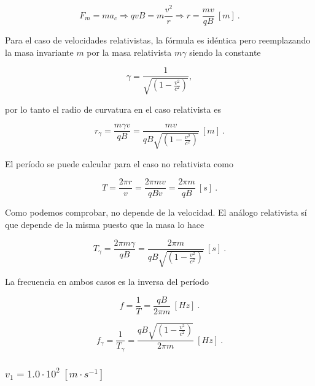 \documentclass[journal]{IEEEtran}
\begin{document}
\begin{equation}
F_m = ma_c \Rightarrow qvB = m \displaystyle\frac{v^2}{r} \Rightarrow r = \displaystyle\frac{mv}{qB}~[m]~.
\end{equation}

Para el caso de velocidades relativistas, la fórmula es idéntica pero reemplazando la masa invariante $m$ por la masa relativista $m\gamma$ siendo la constante

\begin{equation}
\gamma = \displaystyle\frac{1}{\sqrt{(1-\displaystyle\frac{v^2}{c^2})}},
\end{equation}

por lo tanto el radio de curvatura en el caso relativista es

\begin{equation}
r_\gamma = \displaystyle\frac{m\gamma v}{qB} = \displaystyle\frac{mv}{qB\sqrt{(1-\displaystyle\frac{v^2}{c^2})}}~[m]~.
\end{equation}

El período se puede calcular para el caso no relativista como

\begin{equation}
T = \displaystyle\frac{2\pi r}{v} = \displaystyle\frac{2\pi mv}{qBv} = \displaystyle\frac{2\pi m}{qB}~[s]~.
\end{equation}

Como podemos comprobar, no depende de la velocidad. El análogo relativista sí que depende de la misma puesto que la masa lo hace

\begin{equation}
T_\gamma = \displaystyle\frac{2\pi m\gamma}{qB} = \displaystyle\frac{2\pi m}{qB\sqrt{(1-\displaystyle\frac{v^2}{c^2})}} ~[s]~.
\end{equation}

La frecuencia en ambos casos es la inversa del período

\begin{equation}
    f = \displaystyle\frac{1}{T} = \displaystyle\frac{qB}{2\pi m}~[Hz]~.
\end{equation}

\begin{equation}
    f_\gamma = \displaystyle\frac{1}{T_\gamma} = \displaystyle\frac{qB\sqrt{(1-\displaystyle\frac{v^2}{c^2})}}{2\pi m}~[Hz]~.
\end{equation}

\subsubsection{$v_1 = 1.0\cdot 10^2~[m\cdot s^{-1}]$}
\end{document}
